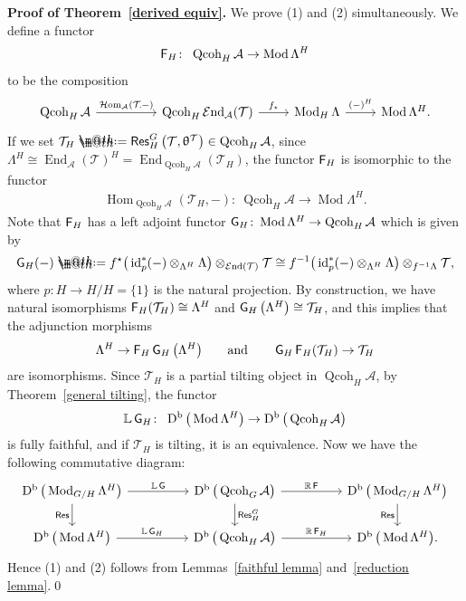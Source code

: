 \documentclass[pdftex]{sigma}%
\makeatletter
\newcommand*{\defeq}{\mathrel{\rlap{%
 \raisebox{0.3ex}{$\m@th\cdot$}}%
 \raisebox{-0.3ex}{$\m@th\cdot$}}%
 =}
\numberwithin{equation}{section}
\newcommand{\Hom}{\operatorname{Hom}}
\newcommand{\cHom}{\operatorname{{\mathcal H}om}}
\newcommand{\End}{\operatorname{End}}
\newcommand{\cEnd}{\operatorname{{\mathcal E}nd}}
\newcommand{\Qcoh}{\operatorname{Qcoh}}
\newcommand{\Mod}{\operatorname{Mod}}
\newcommand{\Db}{\operatorname{D^b}}
\newcommand{\id}{\operatorname{id}}
\newcommand{\Res}{\operatorname{\sf Res}}
\newcommand{\cA}{\mathcal{A}}
\newcommand{\cT}{\mathcal{T}}
\newcommand{\bL}{\mathbb{L}}
\newcommand{\bR}{\mathbb{R}}
\newcommand{\F}{\operatorname{\sf{F}}}
\newcommand{\G}{\operatorname{\sf{G}}}
\makeatother
\begin{document}
\noindent
{\bf Proof of Theorem~\ref{derived equiv}.}
We prove (1) and (2) simultaneously. We define a functor
\begin{gather*}
\F_H\colon\ \Qcoh_H\cA\to \Mod\Lambda^H
\end{gather*}
to be the composition
\[
\begin{tikzcd}
\Qcoh_H\cA\arrow[rr,"\cHom_{\cA}(\cT\mbox{\hspace{-0.5mm}\tiny ,}-)"]&&\Qcoh_H\cEnd_{\cA}(\cT)\arrow[r,"f_{\star}"]&\Mod_H\Lambda\arrow[r,"(-)^H"]&\Mod\Lambda^H.
\end{tikzcd}
\]
If we set $\cT_H\defeq\Res^G_H\big(\cT,\uptheta^{\cT}\big)\in \Qcoh_H\cA$, since $\Lambda^H\cong \End_{\cA}(\cT)^H=\End_{\Qcoh_H\cA}(\cT_H)$, the functor $\F_H$ is isomorphic to the functor
\begin{gather*}
\Hom_{\Qcoh_H\cA}(\cT_H,-)\colon\ \Qcoh_H\cA\to \Mod\Lambda^H.
\end{gather*}
Note that $\F_H$ has a left adjoint functor $\G_H\colon \Mod\Lambda^H\to \Qcoh_H\cA$ which is given by
\begin{gather*}
\G_H(-)\defeq f^{\star}\big(\id_p^*(-)\otimes_{\Lambda^H}\Lambda\big)\otimes_{\cEnd(\cT)}\cT\cong f^{-1}\big(\id_p^*(-)\otimes_{\Lambda^H}\Lambda\big)\otimes_{f^{-1}\Lambda}\cT,
\end{gather*}
where $p\colon H\to H/H=\{1\}$ is the natural projection. By construction, we have natural isomorphisms $\F_H(\cT_H)\cong \Lambda^H$ and $\G_H\big(\Lambda^H\big)\cong \cT_H$, and this implies that the adjunction morphisms
\begin{gather*}
\Lambda^H\to \F_H\G_H\big(\Lambda^H\big) \qquad\text{and}\qquad \G_H\F_H(\cT_H)\to \cT_H
\end{gather*}
are isomorphisms.
Since $\cT_H$ is a partial tilting object in $\Qcoh_H\cA$, by Theorem~\ref{general tilting}, the functor
\begin{gather*}
\bL\G_H\colon\ \Db\big(\Mod\Lambda^H\big)\to \Db\big(\Qcoh_H\cA\big)
\end{gather*}
is fully faithful, and if $\cT_H$ is tilting, it is an equivalence.
Now we have the following commutative diagram:
\[
\begin{tikzcd}
\Db\big(\Mod_{G/H}\Lambda^H\big)\arrow[rr,"\bL\G"]\arrow[d, "\Res"']&&\Db\big(\Qcoh_G\cA\big)\arrow[d, "\Res^G_H"]\arrow[rr,"\bR\F"]&&\Db\big(\Mod_{G/H}\Lambda^H\big)\arrow[d, "\Res"']\\
\Db\big(\Mod\Lambda^H\big)\arrow[rr, "\bL \G_H"]&&\Db\big(\Qcoh_H\cA\big)\arrow[rr, "\bR \F_H"]&&\Db\big(\Mod\Lambda^H\big).
\end{tikzcd}
\]
Hence (1) and (2) follows from Lemmas~\ref{faithful lemma} and~\ref{reduction lemma}.\qed
\end{document}
